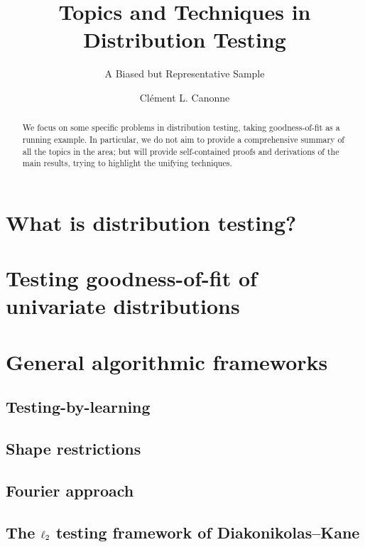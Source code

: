 \documentclass[biber]{nowfnt} %
\title{Topics and Techniques in Distribution Testing}
\subtitle{A Biased but Representative Sample}
\author[1]{Cl\'ement L. Canonne}
\affil[1]{University of Sydney; clement.canonne@sydney.edu.au}
\begin{document}
\makeabstracttitle
\begin{abstract}
We focus on some specific problems in distribution testing,
taking goodness-of-fit as a running example. In particular,
we do not aim to provide a comprehensive summary of all
the topics in the area; but will provide self-contained proofs and derivations of the main results, trying
to highlight the unifying techniques.
\end{abstract}

\chapter{What is distribution testing?}



\chapter{Testing goodness-of-fit of univariate distributions}
  \label{chap:identity}




\chapter{General algorithmic frameworks}
  \label{chap:algorithmic:frameworks}
\section{Testing-by-learning}
\section{Shape restrictions}
\section{Fourier approach}
\section{The $\lp[2]$ testing framework of Diakonikolas--Kane}
\end{document}
